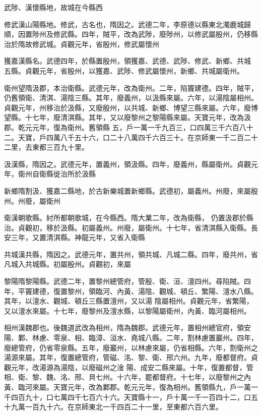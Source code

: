 \begin{pinyinscope}
 武陟、漢懷縣地，故城在今縣西



 修武漢山陽縣地。修武，古名也，隋因之。武德二年，李原德以縣東北濁鹿城歸順，因置陟州及修武縣。四年，賊平，改為武陟，廢陟州，以修武屬殷州，仍移縣治於隋故修武城。貞觀元年，省殷州，修武屬懷州



 獲嘉漢縣名。武德四年，於縣置殷州，領獲嘉、武德、武陟、修武、新鄉、共城
 五縣。貞觀元年，省殷州，以獲嘉、武陟、修武屬懷州，新鄉、共城屬衛州。



 衛州望隋汲郡，本治衛縣。武德元年，改為衛州。二年，陷竇建德。四年，賊平，仍舊領衛、清淇、湯陰三縣。其年，廢義州，以汲縣來屬。六年，以湯陰屬相州。貞觀元年，州移治於汲縣，又廢殷州，以共城、新鄉、博望三縣來屬。六年，廢博望縣。十七年，廢清淇縣。其年，又以廢黎州之黎陽縣來屬。天寶元年，改為汲郡。乾元元年，復為衛州。舊領縣
 五，戶一萬一千九百三，口四萬三千六百八十二。天寶，戶四萬八千五十六，口二十八萬四千六百三十。在京師東一千二百二十二里，去東都三百九十里。



 汲漢縣，隋因之。武德元年，置義州，領汲縣。四年，廢義州，縣屬衛州。貞觀元年，衛州自衛縣徙治所於汲縣



 新鄉隋割汲、獲嘉二縣地，於古新樂城置新鄉縣。武德初，屬義州。州廢，來屬殷州。州廢，屬衛州



 衛漢朝歌縣。紂所都朝歌城，在今縣西。隋大業二年，改為衛縣，
 仍置汲郡於縣治。貞觀初，移於汲縣。初屬義州。州廢，屬衛州。十七年，省清淇縣入衛縣。長安三年，又置清淇縣。神龍元年，又省入衛縣



 共城漢共縣，隋因之。武德元年，置共州，領共城、凡城二縣。四年，廢共州，省凡城入共城縣。初屬殷州。貞觀初，來屬



 黎陽隋黎陽縣。武德二年，置黎州總管府，管殷、衛、洹、澶四州。尋陷賊。四年，平竇建德，復置黎州，領臨河、內黃、湯陰、觀城、頓丘、繁陽、澶水八縣。其年，以澶水、觀城、頓丘三縣置澶州，又以湯
 陰屬相州。貞觀元年，省繁陽，又以澶水來屬。十七年，廢黎州及澶水縣，以黎陽屬衛州，內黃、臨河屬相州。



 相州漢魏郡也。後魏道武改為相州，隋為魏郡。武德元年，置相州總官府，領安陽、鄴、林慮、零泉、相、臨漳、洹水、堯城八縣。二年，割林慮置巖州。四年，廢總管府，仍省零泉縣。五年，廢巖州，以林慮來屬，仍省相縣。六年，割衛州之湯源來屬。其年，復置總管府，管磁、洺、黎、衛、邢六州。九年，廢都督府。貞觀元年，改湯源為湯陰，以廢磁州之淦
 陽、成安二縣來屬。十年，復置都督，管相、衛、黎、魏、洺、邢、貝七州。十六年，罷都督府。十七年，以廢黎州之內黃、臨河來屬。天寶元年，改為鄴郡。乾元元年，復為相州。舊領縣九，戶一萬一千四百九十，口七萬四千七百六十六。天寶縣十一，戶十萬一千一百四十二，口五十九萬一百九十六。在京師東北一千四百二十一里，至東都六百六里。




\end{pinyinscope}
